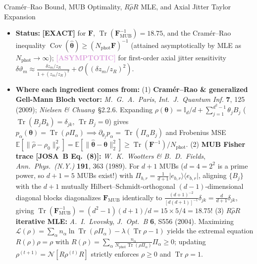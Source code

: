 \documentclass[10pt,letterpaper]{article}
\newcommand{\ket}[1]{\lvert #1 \rangle}
\newcommand{\bra}[1]{\langle #1 \rvert}
\newcommand{\norm}[1]{\lVert #1 \rVert}
\newcommand{\josb}[1]{\textbf{[JOSA~B Eq.~(#1)]}}
\newcommand{\tagexact}{\textcolor{forest}{\textbf{[EXACT]}}}
\newcommand{\tagasymp}{\textcolor{plum}{\textbf{[ASYMPTOTIC]}}}
\numberwithin{equation}{section}
\begin{document}
\begin{approxbox}{Cram\'er--Rao Bound, MUB Optimality, $R\hat{\rho}R$ MLE, and Axial Jitter Taylor Expansion}
\begin{itemize}[leftmargin=1.4em,itemsep=2pt,topsep=1pt]
  \item \textbf{Status:} \tagexact{} for $\mathbf{F}$, $\operatorname{Tr}(\mathbf{F}_{\mathrm{MUB}}^{-1}) = 18.75$, and the Cram\'er--Rao inequality $\operatorname{Cov}(\hat{\boldsymbol{\theta}}) \ge (N_{\mathrm{phot}}\mathbf{F})^{-1}$ (attained asymptotically by MLE as $N_{\mathrm{phot}} \to \infty$); \tagasymp{} for first-order axial jitter sensitivity $\delta\vartheta_m \approx \frac{\delta z_m/z_R}{1+(z_m/z_R)^2} + \mathcal{O}((\delta z_m/z_R)^2)$.
  \item \textbf{Where each ingredient comes from:}
    (1) \textbf{Cram\'er--Rao \& generalized Gell-Mann Bloch vector:} \emph{M.\ G.\ A.\ Paris}, \emph{Int.\ J.\ Quantum Inf.} \textbf{7}, 125 (2009); \emph{Nielsen \& Chuang}~\S2.2.6. Expanding $\rho(\boldsymbol{\theta}) = \mathbb{I}_d/d + \sum_{j=1}^{d^2-1}\theta_j B_j$ ($\operatorname{Tr}(B_j B_k) = \delta_{jk}$, $\operatorname{Tr} B_j = 0$) gives $p_\alpha(\boldsymbol{\theta}) = \operatorname{Tr}(\rho\Pi_\alpha) \implies \partial_{\theta_j} p_\alpha = \operatorname{Tr}(\Pi_\alpha B_j)$ and Frobenius MSE $\mathbb{E}[\norm{\hat{\rho}-\rho_0}_F^2] = \mathbb{E}[\norm{\hat{\boldsymbol{\theta}}-\boldsymbol{\theta}}_2^2] \ge \operatorname{Tr}(\mathbf{F}^{-1})/N_{\mathrm{phot}}$.
    (2) \textbf{MUB Fisher trace \josb{8}:} \emph{W.\ K.\ Wootters \& B.\ D.\ Fields}, \emph{Ann.\ Phys.\ (N.Y.)} \textbf{191}, 363 (1989). For $d+1$ MUBs ($d = 4 = 2^2$ is a prime power, so $d+1 = 5$ MUBs exist!) with $\Pi_{b,r} = \frac{1}{d+1}\ket{e_{b,r}}\bra{e_{b,r}}$, aligning $\{B_j\}$ with the $d+1$ mutually Hilbert--Schmidt-orthogonal $(d-1)$-dimensional diagonal blocks diagonalizes $\mathbf{F}_{\mathrm{MUB}}$ identically to $\frac{(d+1)^{-2}}{[d(d+1)]^{-1}}\delta_{jk} = \frac{d}{d+1}\delta_{jk}$, giving $\operatorname{Tr}(\mathbf{F}_{\mathrm{MUB}}^{-1}) = (d^2-1)(d+1)/d = 15\times 5/4 = \mathbf{18.75}$!
    (3) \textbf{$R\hat{\rho}R$ iterative MLE:} \emph{A.\ I.\ Lvovsky}, \emph{J.\ Opt.\ B} \textbf{6}, S556 (2004). Maximizing $\mathcal{L}(\rho) = \sum_\alpha n_\alpha\ln\operatorname{Tr}(\rho\Pi_\alpha) - \lambda(\operatorname{Tr}\rho - 1)$ yields the extremal equation $R(\rho)\rho = \rho$ with $R(\rho) = \sum_\alpha \frac{n_\alpha}{N_{\mathrm{phot}}\operatorname{Tr}(\rho\Pi_\alpha)}\Pi_\alpha \ge 0$; updating $\rho^{(t+1)} = \mathcal{N}[R\rho^{(t)}R]$ strictly enforces $\rho \ge 0$ and $\operatorname{Tr}\rho = 1$.
\end{itemize}
\end{approxbox}
\end{document}
